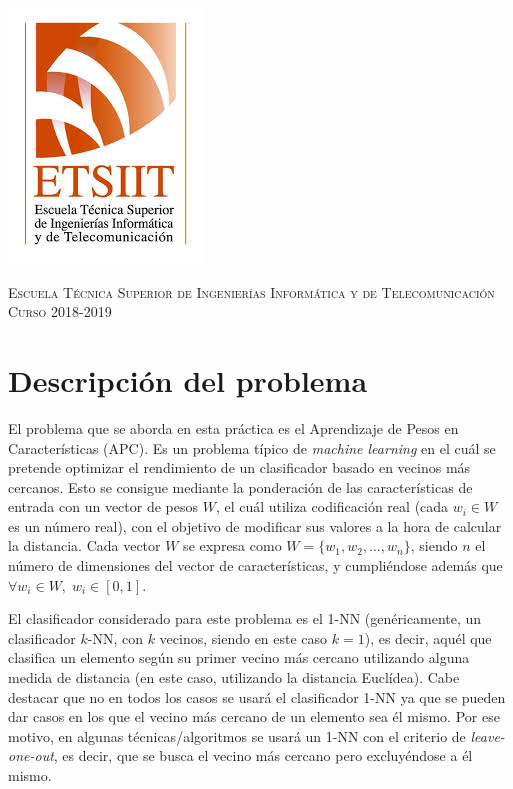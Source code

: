 \documentclass[11pt,a4paper]{article}
\begin{document}
\begin{titlepage}
\begin{minipage}{\textwidth}
\includegraphics[scale=0.3]{img/etsiit.jpeg}

\vspace{0.3cm}
\textsc{Escuela Técnica Superior de Ingenierías Informática y de Telecomunicación}\\
\vspace{1cm}
\textsc{Curso 2018-2019}
\end{minipage}
\end{titlepage}

\tableofcontents
\thispagestyle{empty}				%

\newpage

\setlength{\parskip}{1em}

\section{Descripción del problema}

El problema que se aborda en esta práctica es el Aprendizaje de Pesos en Características (APC). Es un problema típico de
\textit{machine learning} en el cuál se pretende optimizar el rendimiento de un clasificador basado en vecinos más cercanos.
Esto se consigue mediante la ponderación de las características de entrada con un vector de pesos $W$, el cuál utiliza
codificación real (cada $w_i \in W$ es un número real), con el objetivo de modificar sus valores a la hora de calcular la
distancia. Cada vector $W$ se expresa como $W = \lbrace w_1, w_2, \dots , w_n \rbrace$, siendo $n$ el número de dimensiones
del vector de características, y cumpliéndose además que $\forall w_i \in W, \; w_i \in [0, 1]$.\par

El clasificador considerado para este problema es el 1-NN (genéricamente, un clasificador $k$-NN, con $k$ vecinos, siendo
en este caso $k = 1$), es decir, aquél que clasifica un elemento según su primer vecino más cercano utilizando alguna medida
de distancia (en este caso, utilizando la distancia Euclídea). Cabe destacar que no en todos los casos se usará el clasificador
1-NN ya que se pueden dar casos en los que el vecino más cercano de un elemento sea él mismo. Por ese motivo, en algunas
técnicas/algoritmos se usará un 1-NN con el criterio de \textit{leave-one-out}, es decir, que se busca el vecino más cercano
pero excluyéndose a él mismo.\par
\end{document}
